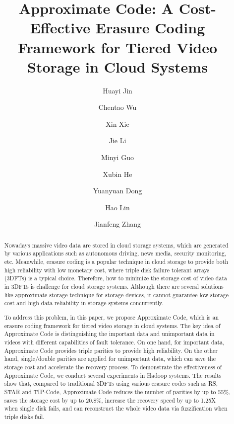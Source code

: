 \documentclass[sigconf]{acmart}
\begin{document}
\title{Approximate Code: A Cost-Effective Erasure Coding Framework for Tiered Video Storage in Cloud Systems}

\author{Huayi Jin}

\author{Chentao Wu}

\author{Xin Xie}

\author{Jie Li}

\author{Minyi Guo}

\author{Xubin He}
\affiliation{%
  \institution{}
}

\author{Yuanyuan Dong}
\author{Hao Lin}
\author{Jianfeng Zhang}
\authornotemark[1]

\begin{abstract}
Nowadays massive video data are stored in cloud storage systems, which are generated by various applications such as autonomous driving, news media, security monitoring, etc. Meanwhile, erasure coding is a popular technique in cloud storage to provide both high reliability with low monetary cost, where triple disk failure tolerant arrays (3DFTs) is a typical choice. Therefore, how to minimize the storage cost of video data in 3DFTs is challenge for cloud storage systems. Although there are several solutions like approximate storage technique for storage devices, it cannot guarantee low storage cost and high data reliability in storage systems concurrently.

To address this problem, in this paper, we propose Approximate Code, which is an erasure coding framework for tiered video storage in cloud systems. The key idea of Approximate Code is distinguishing the important data and unimportant data in videos with different capabilities of fault tolerance. On one hand, for important data, Approximate Code provides triple parities to provide high reliability. On the other hand, single/double parities are applied for unimportant data, which can save the storage cost and accelerate the recovery process. To demonstrate the effectiveness of Approximate Code, we conduct several experiments in Hadoop systems. The results show that, compared to traditional 3DFTs using various erasure codes such as RS, STAR and TIP-Code, Approximate Code reduces the number of parities by up to 55\%, saves the storage cost by up to 20.8\%, increase the recovery speed by up to 1.25X when single disk fails, and can reconstruct the whole video data via fuzzification when triple disks fail.
\end{abstract}
\end{document}
